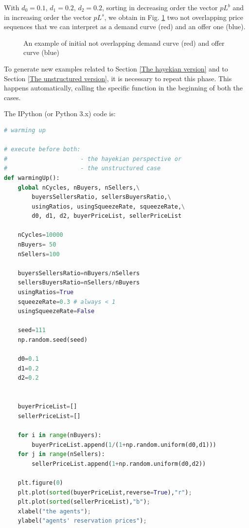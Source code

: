 \documentclass[10pt]{report}
\begin{document}
With  $d_0=0.1$, $d_1=0.2$, $d_2=0.2$, sorting in decreasing order the vector  $pL^b$ and in increasing order the vector  $pL^s$, we obtain in Fig. \ref{output_3_1.png} two not overlapping price sequences that we can interpret as a demand curve (red) and an offer one (blue).

\begin{figure}[H]
\begin{center}
\caption{An example of initial not overlapping demand curve (red) and offer curve (blue)}
\label{output_3_1.png}
\end{center}
\end{figure}

To generate new examples related to Section \ref{The hayekian version} and to Section \ref{The unstructured version}, it is necessary to repeat this phase. This happens automatically, calling the specific function in the beginning of both the cases.


The IPython (or Python 3.x) code is:


\begin{lstlisting}[language=Python, caption=Warming up of the model, 
label={Warming up of the model},basicstyle=\ttfamily\footnotesize]
# warming up

# execute before both: 
#                     - the hayekian perspective or
#                     - the unstructured case
def warmingUp():
    global nCycles, nBuyers, nSellers,\
        buyersSellersRatio, sellersBuyersRatio,\
        usingRatios, usingSqueezeRate, squeezeRate,\
        d0, d1, d2, buyerPriceList, sellerPriceList

    nCycles=10000
    nBuyers= 50
    nSellers=100

    buyersSellersRatio=nBuyers/nSellers
    sellersBuyersRatio=nSellers/nBuyers
    usingRatios=True
    squeezeRate=0.3 # always < 1 
    usingSqueezeRate=False

    seed=111
    np.random.seed(seed)

    d0=0.1
    d1=0.2
    d2=0.2


    buyerPriceList=[]
    sellerPriceList=[]

    for i in range(nBuyers):
        buyerPriceList.append(1/(1+np.random.uniform(d0,d1)))
    for j in range(nSellers):
        sellerPriceList.append(1+np.random.uniform(d0,d2))
    
    plt.figure(0)
    plt.plot(sorted(buyerPriceList,reverse=True),"r");
    plt.plot(sorted(sellerPriceList),"b");
    xlabel("the agents");
    ylabel("agents' reservation prices");
\end{lstlisting}
\end{document}
